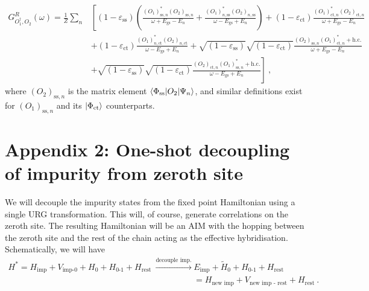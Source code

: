 \begin{eqnarray}
	G^R_{O_1^\dagger,O_2}(\omega) = \frac{1}{Z}\sum_n &\left[\left(1 - \varepsilon_\text{ss} \right) \left(\frac{\left(O_1\right)_{\text{ss},n}^* \left( O_2 \right)_{\text{ss}, n}}{\omega + E_\text{gs} - E_n} + \frac{\left(O_1\right)_{n,\text{ss}}^* \left( O_2 \right)_{n,\text{ss}}}{\omega - E_\text{gs} + E_n}\right) + \left(1 - \varepsilon_\text{ct} \right) \frac{\left(O_1\right)_{\text{ct},n}^* \left( O_2 \right)_{\text{ct}, n}}{\omega + E_\text{gs} - E_n}\right.\nonumber\\
						&\left. + \left(1 - \varepsilon_\text{ct} \right)\frac{\left(O_1\right)_{n,\text{ct}}^* \left( O_2 \right)_{n,\text{ct}}}{\omega - E_\text{gs} + E_n} + \sqrt{\left(1 - \varepsilon_\text{ss} \right)}\sqrt{\left(1 - \varepsilon_\text{ct} \right)} \frac{\left(O_2\right)_{\text{ss},n} \left( O_1 \right)_{\text{ct},n}^* + \text{h.c.}}{\omega + E_\text{gs} - E_n} \right. \nonumber\\
		&\left.+ \sqrt{\left(1 - \varepsilon_\text{ss} \right)}\sqrt{\left(1 - \varepsilon_\text{ct} \right)}\frac{\left(O_2\right)_{\text{ct},n} \left( O_1 \right)_{\text{ss},n}^* + \text{h.c.}}{\omega - E_\text{gs} + E_n}\right]~,
\end{eqnarray}
where \(\left( O_2 \right)_{\text{ss},n} \) is the matrix element \(\braket{\Phi_\text{ss} | O_2 | \Psi_n}\), and similar definitions exist for \(\left( O_1 \right)_{\text{ss},n} \) and its \(\ket{\Phi_\text{ct}}\) counterparts.

\section*{Appendix 2: One-shot decoupling of impurity from zeroth site}
\label{app-imp-remove}
We will decouple the impurity states from the fixed point Hamiltonian using a single URG transformation. This will, of course, generate correlations on the zeroth site. The resulting Hamiltonian will be an AIM with the hopping between the zeroth site and the rest of the chain acting as the effective hybridisation. Schematically, we will have
\begin{eqnarray}
	H^* = H_\text{imp} + V_\text{imp-0} + H_\text{0} + H_\text{0-1} + H_\text{rest} ~ {\xrightarrow{\text{decouple imp.}}} & E_\text{imp} + \tilde H_\text{0} + H_\text{0-1} + H_\text{rest} \nonumber\\
															       &= H_\text{new imp} + V_\text{new imp - rest} + H_\text{rest}~.
\end{eqnarray}

